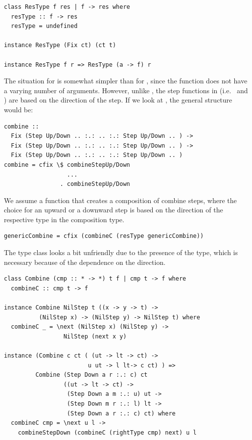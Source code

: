 \documentclass[preprint,natbib]{sigplanconf}
\begin{document}
\begin{small}
\begin{verbatim}
class ResType f res | f -> res where
  resType :: f -> res
  resType = undefined

instance ResType (Fix ct) (ct t)
  
instance ResType f r => ResType (a -> f) r
\end{verbatim}
\end{small}




The situation for  is somewhat simpler than for , since the function does not have a varying number of arguments. However, unlike , the step functions in   (i.e.\  and ) are based on the direction of the step. If we look at , the general structure would be:

\begin{small}
\begin{verbatim}
combine :: 
  Fix (Step Up/Down .. :.: .. :.: Step Up/Down .. ) ->
  Fix (Step Up/Down .. :.: .. :.: Step Up/Down .. ) ->
  Fix (Step Up/Down .. :.: .. :.: Step Up/Down .. )
combine = cfix \$ combineStepUp/Down 
                  ...
                . combineStepUp/Down 
\end{verbatim}%
\end{small}

We assume a function that creates a composition of  combine steps, where the choice for an upward or a downward step is based on the direction of the respective  type in the composition type.


\begin{small}
\begin{verbatim}
genericCombine = cfix (combineC (resType genericCombine))
\end{verbatim}%
\end{small}

The type class looks a bit unfriendly due to the presence of the  type, which is necessary because of the dependence on the direction.

\begin{small}
\begin{verbatim}
class Combine (cmp :: * -> *) t f | cmp t -> f where
  combineC :: cmp t -> f

instance Combine NilStep t ((x -> y -> t) -> 
          (NilStep x) -> (NilStep y) -> NilStep t) where
  combineC _ = \next (NilStep x) (NilStep y) ->
                 NilStep (next x y) 
 
instance (Combine c ct ( (ut -> lt -> ct) ->
                        u ut -> l lt-> c ct) ) =>
         Combine (Step Down a r :.: c) ct
                 ((ut -> lt -> ct) ->
                  (Step Down a m :.: u) ut -> 
                  (Step Down m r :.: l) lt -> 
                  (Step Down a r :.: c) ct) where
  combineC cmp = \next u l ->
    combineStepDown (combineC (rightType cmp) next) u l
\end{verbatim}
\end{small}
\end{document}
